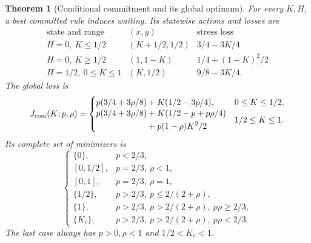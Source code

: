 \documentclass[11pt,a4paper]{article}
\numberwithin{equation}{section}
\newtheorem{theorem}{Theorem}[section]
\theoremstyle{definition}
\begin{document}
\begin{theorem}[Conditional commitment and its global optimum]\label{thm:commitment}
For every \(K,H\), a best committed rule induces waiting. Its statewise
actions and losses are
\begin{equation}\label{eq:commitstates}
\begin{array}{c|c|c}
\text{state and range}&(x,y)&\text{stress loss}\\ \hline
H=0,\ K\le1/2&(K+1/2,1/2)&3/4-3K/4\\
H=0,\ K\ge1/2&(1,1-K)&1/4+(1-K)^2/2\\
H=1/2,\ 0\le K\le1&(K,1/2)&9/8-3K/4 .
\end{array}
\end{equation}
The global loss is
\begin{equation}\label{eq:Jcommit}
J_{\rm com}(K;p,\rho)=
\begin{cases}
p(3/4+3\rho/8)+K(1/2-3p/4),&0\le K\le1/2,\\
\begin{aligned}
p(3/4+3\rho/8)&+K(1/2-p+p\rho/4)\\
              &+p(1-\rho)K^2/2
\end{aligned}&1/2\le K\le1 .
\end{cases}
\end{equation}
Its complete set of minimizers is
\begin{equation}\label{eq:commitclass}
\begin{cases}
\{0\},&p<2/3,\\
[0,1/2],&p=2/3,\ \rho<1,\\
[0,1],&p=2/3,\ \rho=1,\\
\{1/2\},&p>2/3,\ p\le2/(2+\rho),\\
\{1\},&p>2/3,\ p>2/(2+\rho),\ p\rho\ge2/3,\\
\{K_c\},&p>2/3,\ p>2/(2+\rho),\ p\rho<2/3 .
\end{cases}
\end{equation}
The last case always has \(p>0,\rho<1\) and \(1/2<K_c<1\).
\end{theorem}
\end{document}
